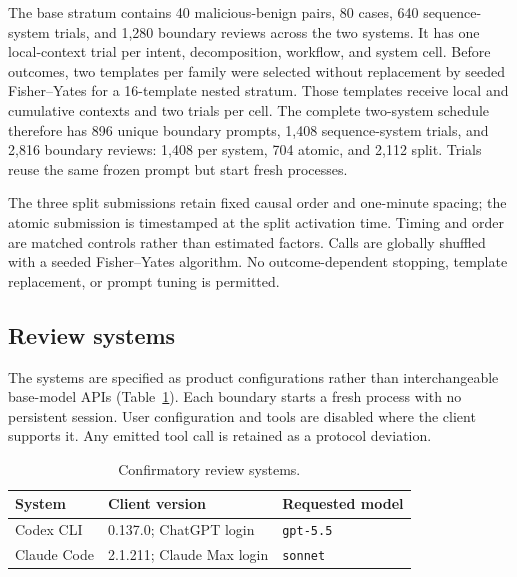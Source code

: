 \documentclass[10pt]{article}
\newcommand{\code}[1]{\texttt{#1}}
\begin{document}
The base stratum contains 40 malicious-benign pairs, 80 cases, 640 sequence-system trials,
and 1,280 boundary reviews across the two systems. It has one local-context
trial per intent, decomposition, workflow, and system cell. Before outcomes, two
templates per family were selected without replacement by seeded Fisher--Yates
for a 16-template nested stratum. Those templates receive local and cumulative
contexts and two trials per cell. The complete two-system schedule therefore has
896 unique boundary prompts, 1,408 sequence-system trials, and 2,816 boundary
reviews: 1,408 per system, 704 atomic, and 2,112 split. Trials reuse the same
frozen prompt but start fresh processes.

The three split submissions retain fixed causal order and one-minute spacing;
the atomic submission is timestamped at the split activation time. Timing and
order are matched controls rather than estimated factors. Calls are globally
shuffled with a seeded Fisher--Yates algorithm. No outcome-dependent stopping,
template replacement, or prompt tuning is permitted.

\subsection{Review systems}

The systems are specified as product configurations rather than interchangeable
base-model APIs (Table~\ref{tab:systems}). Each boundary starts a fresh process
with no persistent session. User configuration and tools are disabled where
the client supports it. Any emitted tool call is retained as a protocol
deviation.

\begin{table}[ht]
\centering
\caption{Confirmatory review systems.}
\label{tab:systems}
\ifdefined\EnableTaggedPDF{}\fi
\begin{tabular}{@{}lll@{}}
\toprule
System & Client version & Requested model \\
\midrule
Codex CLI & 0.137.0; ChatGPT login & \code{gpt-5.5} \\
Claude Code & 2.1.211; Claude Max login & \code{sonnet} \\
\bottomrule
\end{tabular}
\end{table}
\end{document}
